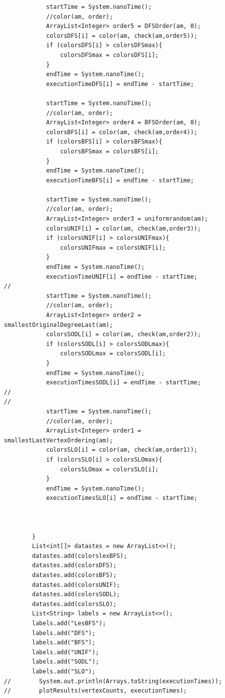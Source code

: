 \documentclass{article}
\begin{document}
\begin{verbatim}
            startTime = System.nanoTime();
            //color(am, order);
            ArrayList<Integer> order5 = DFSOrder(am, 0);
            colorsDFS[i] = color(am, check(am,order5));
            if (colorsDFS[i] > colorsDFSmax){
                colorsDFSmax = colorsDFS[i];
            }
            endTime = System.nanoTime();
            executionTimeDFS[i] = endTime - startTime;

            startTime = System.nanoTime();
            //color(am, order);
            ArrayList<Integer> order4 = BFSOrder(am, 0);
            colorsBFS[i] = color(am, check(am,order4));
            if (colorsBFS[i] > colorsBFSmax){
                colorsBFSmax = colorsBFS[i];
            }
            endTime = System.nanoTime();
            executionTimeBFS[i] = endTime - startTime;

            startTime = System.nanoTime();
            //color(am, order);
            ArrayList<Integer> order3 = uniformrandom(am);
            colorsUNIF[i] = color(am, check(am,order3));
            if (colorsUNIF[i] > colorsUNIFmax){
                colorsUNIFmax = colorsUNIF[i];
            }
            endTime = System.nanoTime();
            executionTimeUNIF[i] = endTime - startTime;
//
            startTime = System.nanoTime();
            //color(am, order);
            ArrayList<Integer> order2 = smallestOriginalDegreeLast(am);
            colorsSODL[i] = color(am, check(am,order2));
            if (colorsSODL[i] > colorsSODLmax){
                colorsSODLmax = colorsSODL[i];
            }
            endTime = System.nanoTime();
            executionTimesSODL[i] = endTime - startTime;
//
//
            startTime = System.nanoTime();
            //color(am, order);
            ArrayList<Integer> order1 = smallestLastVertexOrdering(am);
            colorsSLO[i] = color(am, check(am,order1));
            if (colorsSLO[i] > colorsSLOmax){
                colorsSLOmax = colorsSLO[i];
            }
            endTime = System.nanoTime();
            executionTimesSLO[i] = endTime - startTime;



        }
        List<int[]> datastes = new ArrayList<>();
        datastes.add(colorslexBFS);
        datastes.add(colorsDFS);
        datastes.add(colorsBFS);
        datastes.add(colorsUNIF);
        datastes.add(colorsSODL);
        datastes.add(colorsSLO);
        List<String> labels = new ArrayList<>();
        labels.add("LesBFS");
        labels.add("DFS");
        labels.add("BFS");
        labels.add("UNIF");
        labels.add("SODL");
        labels.add("SLO");
//        System.out.println(Arrays.toString(executionTimes));
//        plotResults(vertexCounts, executionTimes);




\end{verbatim}
\end{document}

